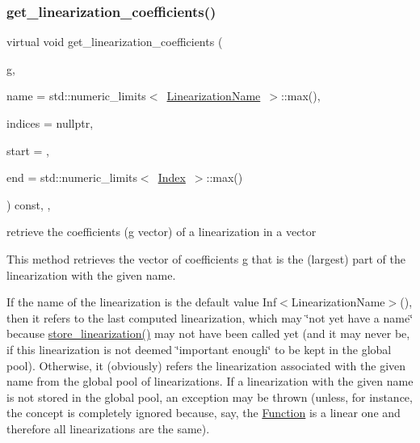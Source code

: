 \subsubsection{\texorpdfstring{get\+\_\+linearization\+\_\+coefficients()}{get\_linearization\_coefficients()}\hspace{0.1cm}{\footnotesize\ttfamily [3/4]}}
{\footnotesize\ttfamily virtual void get\+\_\+linearization\+\_\+coefficients (\begin{DoxyParamCaption}\item[{\mbox{\hyperlink{class_s_m_spp__di__unipi__it_1_1_function_a9ad432406b609e28d340f73e9474bffe}{Function\+Value}} $\ast$}]{g,  }\item[{const \mbox{\hyperlink{class_s_m_spp__di__unipi__it_1_1_c05_function_ae90bf93c6d4b4ada66791c735d1c03cc}{Linearization\+Name}}}]{name = {\ttfamily std\+:\+:numeric\+\_\+limits$<$~\mbox{\hyperlink{class_s_m_spp__di__unipi__it_1_1_c05_function_ae90bf93c6d4b4ada66791c735d1c03cc}{Linearization\+Name}}~$>$\+:\+:max()},  }\item[{\mbox{\hyperlink{group___thin_var_dep_interface___c_l_a_s_s_e_s_ga03461123d4f6090aefeb97ef653d3f2b}{c\+\_\+\+Vec\+\_\+\+Index}} $\ast$const}]{indices = {\ttfamily nullptr},  }\item[{\mbox{\hyperlink{group___thin_var_dep_interface___c_l_a_s_s_e_s_gaee6156e2ce80720d57a082d80f39d8cc}{c\+\_\+\+Index}}}]{start = {},  }\item[{\mbox{\hyperlink{group___thin_var_dep_interface___c_l_a_s_s_e_s_gaee6156e2ce80720d57a082d80f39d8cc}{c\+\_\+\+Index}}}]{end = {\ttfamily std\+:\+:numeric\+\_\+limits$<$~\mbox{\hyperlink{group___thin_var_dep_interface___c_l_a_s_s_e_s_gad53d6229d7ec28555a9c9c2fd9abf773}{Index}}~$>$\+:\+:max()} }\end{DoxyParamCaption}) const\hspace{0.3cm}{\ttfamily [final]}, {\ttfamily [override]}, {\ttfamily [virtual]}}



retrieve the coefficients (g vector) of a linearization in a vector 

This method retrieves the vector of coefficients g that is the (largest) part of the linearization with the given name.

If the name of the linearization is the default value Inf$<$\+Linearization\+Name$>$(), then it refers to the last computed linearization, which may \char`\"{}not yet have a name\char`\"{} because \mbox{\hyperlink{class_s_m_spp__di__unipi__it_1_1_c05_function_ac477d0c3276fa28127d5aff69f31c367}{store\+\_\+linearization()}} may not have been called yet (and it may never be, if this linearization is not deemed \char`\"{}important enough\char`\"{} to be kept in the global pool). Otherwise, it (obviously) refers the linearization associated with the given name from the global pool of linearizations. If a linearization with the given name is not stored in the global pool, an exception may be thrown (unless, for instance, the concept is completely ignored because, say, the \mbox{\hyperlink{class_s_m_spp__di__unipi__it_1_1_function}{Function}} is a linear one and therefore all linearizations are the same).

